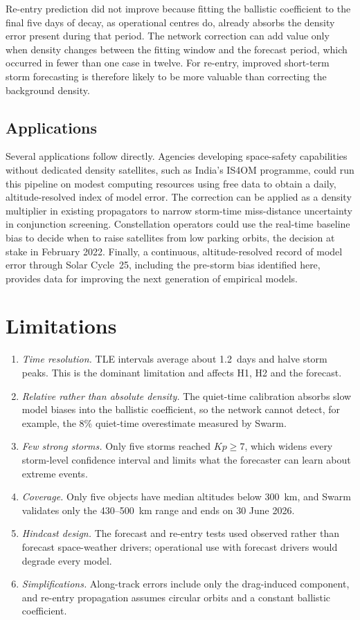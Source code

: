 \documentclass[11pt]{article}
\newcommand{\Kp}{\mathit{Kp}}
\begin{document}
Re-entry prediction did not improve because fitting the ballistic coefficient to the final five days of decay, as operational centres do, already absorbs the density error present during that period. The network correction can add value only when density changes between the fitting window and the forecast period, which occurred in fewer than one case in twelve. For re-entry, improved short-term storm forecasting is therefore likely to be more valuable than correcting the background density.

\subsection{Applications}
Several applications follow directly. Agencies developing space-safety capabilities without dedicated density satellites, such as India's IS4OM programme, could run this pipeline on modest computing resources using free data to obtain a daily, altitude-resolved index of model error. The correction can be applied as a density multiplier in existing propagators to narrow storm-time miss-distance uncertainty in conjunction screening. Constellation operators could use the real-time baseline bias to decide when to raise satellites from low parking orbits, the decision at stake in February 2022. Finally, a continuous, altitude-resolved record of model error through Solar Cycle~25, including the pre-storm bias identified here, provides data for improving the next generation of empirical models.

\section{Limitations}\label{sec:limits}
\begin{enumerate}
\item \textit{Time resolution.} TLE intervals average about 1.2~days and halve storm peaks. This is the dominant limitation and affects H1, H2 and the forecast.
\item \textit{Relative rather than absolute density.} The quiet-time calibration absorbs slow model biases into the ballistic coefficient, so the network cannot detect, for example, the 8\% quiet-time overestimate measured by Swarm.
\item \textit{Few strong storms.} Only five storms reached $\Kp \geq 7$, which widens every storm-level confidence interval and limits what the forecaster can learn about extreme events.
\item \textit{Coverage.} Only five objects have median altitudes below 300~km, and Swarm validates only the 430--500~km range and ends on 30 June 2026.
\item \textit{Hindcast design.} The forecast and re-entry tests used observed rather than forecast space-weather drivers; operational use with forecast drivers would degrade every model.
\item \textit{Simplifications.} Along-track errors include only the drag-induced component, and re-entry propagation assumes circular orbits and a constant ballistic coefficient.
\end{enumerate}
\end{document}
